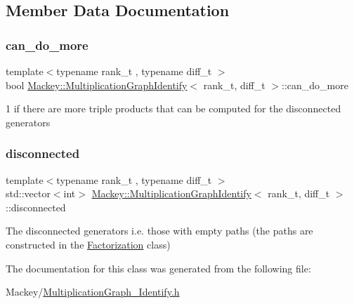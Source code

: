 \subsection{Member Data Documentation}
\mbox{\label{classMackey_1_1MultiplicationGraphIdentify_a8356b59250ebac1ac30ebc7407bd352b}} 
\subsubsection{\texorpdfstring{can\+\_\+do\+\_\+more}{can\_do\_more}}
{\footnotesize\ttfamily template$<$typename rank\+\_\+t , typename diff\+\_\+t $>$ \\
bool \hyperlink{classMackey_1_1MultiplicationGraphIdentify}{Mackey\+::\+Multiplication\+Graph\+Identify}$<$ rank\+\_\+t, diff\+\_\+t $>$\+::can\+\_\+do\+\_\+more\hspace{0.3cm}{\ttfamily [protected]}}



1 if there are more triple products that can be computed for the disconnected generators 

\mbox{\label{classMackey_1_1MultiplicationGraphIdentify_a9063120241d724ba34a2f48f193ad2e2}} 
\subsubsection{\texorpdfstring{disconnected}{disconnected}}
{\footnotesize\ttfamily template$<$typename rank\+\_\+t , typename diff\+\_\+t $>$ \\
std\+::vector$<$int$>$ \hyperlink{classMackey_1_1MultiplicationGraphIdentify}{Mackey\+::\+Multiplication\+Graph\+Identify}$<$ rank\+\_\+t, diff\+\_\+t $>$\+::disconnected\hspace{0.3cm}{\ttfamily [protected]}}



The disconnected generators i.\+e. those with empty paths (the paths are constructed in the \hyperlink{classMackey_1_1Factorization}{Factorization} class) 



The documentation for this class was generated from the following file\+:\begin{DoxyCompactItemize}
\item 
Mackey/\hyperlink{MultiplicationGraph__Identify_8h}{Multiplication\+Graph\+\_\+\+Identify.\+h}\end{DoxyCompactItemize}
